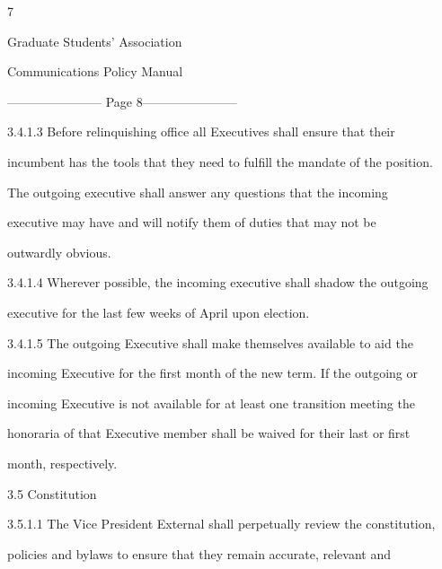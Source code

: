                                                       7  

                                      

                                    Graduate Students’ Association  

                                   Communications Policy Manual  

  


----------------------- Page 8-----------------------

  

3.4.1.3           Before  relinquishing  office  all  Executives  shall  ensure  that  their  

         incumbent has the tools that they need to fulfill the mandate of the position.  

         The  outgoing  executive  shall  answer  any  questions  that  the  incoming  

         executive  may  have  and  will  notify  them  of  duties  that  may  not  be  

         outwardly obvious.   

  

3.4.1.4           Wherever possible, the incoming executive shall shadow the outgoing  

         executive for the last few weeks of April upon election.   

3.4.1.5           The  outgoing  Executive  shall  make  themselves  available  to  aid  the  

         incoming Executive for the first month of the new term. If the outgoing or  

         incoming Executive is not available for at least one transition meeting the  

         honoraria  of  that  Executive  member  shall  be  waived  for  their  last  or  first  

         month, respectively.  

  

                                       3.5      Constitution   

  

3.5.1.1           The Vice President External shall perpetually review the constitution,  



         policies  and  bylaws  to  ensure  that  they  remain  accurate,  relevant  and  



